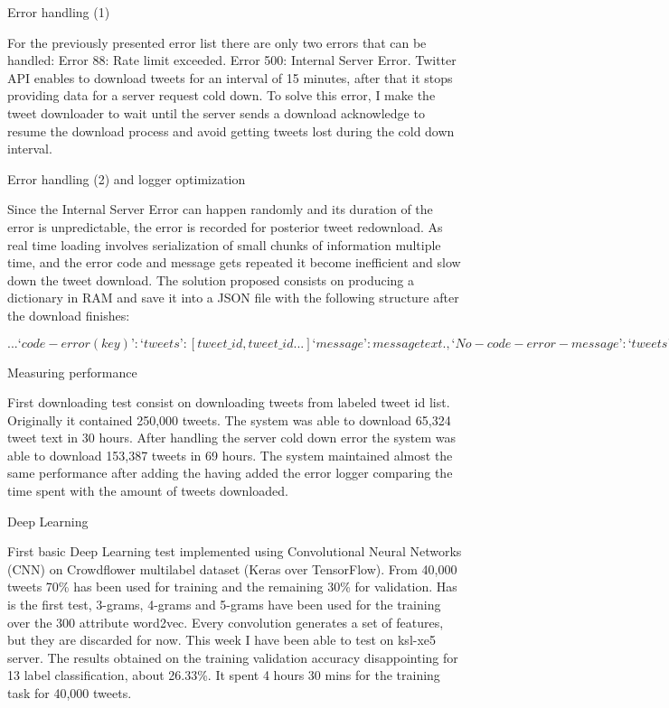 Error handling (1)

For the previously presented error list there are only two errors that can be handled:
Error 88: Rate limit exceeded.
Error 500: Internal Server Error.
Twitter API enables to download tweets for an interval of 15 minutes, after that it stops providing data for a server request cold down. To solve this error, I make the tweet downloader to wait until the server sends a download acknowledge to resume the download process and avoid getting tweets lost during the cold down interval.

Error handling (2) and logger optimization

Since the Internal Server Error can happen randomly and its duration of the error is unpredictable, the error is recorded for posterior tweet redownload.
As real time loading involves serialization of small chunks of information multiple time, and the error code and message gets repeated it become inefficient and slow down the tweet download. The solution proposed consists on producing a dictionary in RAM and save it into a JSON file with the following structure after the download finishes:

$...
‘code-error (key)’: {
‘tweets’: [
	tweet\_id,
	tweet\_id
	...
]
‘message’: message text.
},
‘No-code-error-message’: {
	‘tweets’: [
	tweet\_id
]
}
...$

Measuring performance

First downloading test consist on downloading tweets from labeled tweet id list. Originally it contained 250,000 tweets. The system was able to download 65,324 tweet text in 30 hours.
After handling the server cold down error the system was able to download 153,387 tweets in 69 hours.
The system maintained almost the same performance after adding the having added the error logger comparing the time spent with the amount of tweets downloaded.

Deep Learning

First basic Deep Learning test implemented using Convolutional Neural Networks (CNN) on Crowdflower multilabel dataset (Keras over TensorFlow). From 40,000 tweets 70\% has been used for training and the remaining 30\% for validation. Has is the first test, 3-grams, 4-grams and 5-grams have been used for the training over the 300 attribute word2vec. Every convolution generates a set of features, but they are discarded for now.
This week I have been able to test on ksl-xe5 server. The results obtained on the training validation accuracy disappointing for 13 label classification, about 26.33\%. It spent 4 hours 30 mins for the training task for 40,000 tweets.

